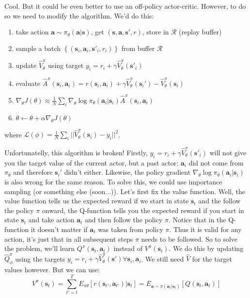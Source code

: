 \documentclass{report}
\begin{document}
Cool. But it could be even better to use an off-policy actor-critic.
However, to do so we need to modify the algorithm.
We'd do this:
\begin{enumerate}
		\item take action $\bm{a} \sim \pi_\theta(\bm{a}|\bm{s})$, get $(\bm{s}, \bm{a},\bm{s'},r)$, store in $\mathcal{R}$ (replay buffer)
		\item sample a batch $\left\{  (\bm{s}_i, \bm{a}_i,\bm{s'}_i,r_i) \right\} $ from buffer $\mathcal{R}$
		\item update $\hat{V}^\pi_\theta$ using target $y_i = r_i + \gamma \hat{V}^\pi_\theta(\bm{s'}_i)$
		\item evaluate $\hat{A}^\pi(\bm{s}_{i}, \bm{a}_{i})  = r(\bm{s}_{i}, \bm{a}_{i}) + \gamma \hat{V}^\pi_\theta(\bm{s}_i') - \hat{V}^\pi_\theta(\bm{s}_i)$
		\item $\nabla_\theta J(\theta) \approx  \frac{1}{N} \sum_{i}^{}  \nabla_{\theta} \log \pi_\theta(\bm{a}_i|\bm{s}_i)\hat{A}^\pi(\bm{s}_{i}, \bm{a}_{i})$
		\item $\theta \leftarrow \theta  + \alpha \nabla_\theta J(\theta)$
\end{enumerate}
where  $\mathcal{L}(\phi) = \frac{1}{N} \sum_{i}^{} || \hat{V}^\pi_\theta(\bm{s}_i) - y_i||^2 $.

Unfortunatelly, this algorithm is broken!
Firstly, $y_i = r_i + \gamma \hat{V}^\pi_\theta(\bm{s'}_i)$ will not give you the target value 
of the current actor, but a past actor: $\bm{a}_i$ did not come from $\pi_\theta$
and therefore $\bm{s}_i'$ didn't either.
Likewise, the policy gradient $\nabla_{\theta} \log \pi_\theta(\bm{a}_i|\bm{s}_i)$ is also wrong for the same reason.
To solve this, we could use importance sampling (or something else (soon...)).
Let's first fix the value function.
Well, the value function tells us the expected reward if we start in state $\bm{s}_t$ and the follow the policy $\pi$ onward,
the Q-function tells you the expected reward if you start in state $\bm{s}_t$ and take action $\bm{a}_t$ and then 
follow the policy $\pi$.
Notice that in the Q-function it doesn't matter if $\bm{a}_t$ was taken from policy $\pi$.
Thus it is valid for any action, it's just that in all subsequent steps $\pi$ needs to be followed.
So to solve the problem, we'll learn $Q^\pi(\bm{s}_{t}, \bm{a}_{t})$ instead of $V^\pi(\bm{s}_t)$.
We do this by updating $\hat{Q}^\pi_\phi $ using the targets
$y_i = r_i + \gamma \hat{V}^\pi_\theta(\bm{s}') \forall \bm{s}_i, \bm{a}_i$.
We still need $\hat{V}$ for the target values however.
But we can use:
\begin{equation}
		V^\pi(\bm{s}_t) = \sum_{t'=t}^{T} E_{\pi\theta} \left[ r(\bm{s}_{t'}, \bm{a}_{t'})|\bm{s}_t \right] = E_{\bm{a} \sim \pi(\bm{a}_t | \bm{s}_t)} \left[ Q(\bm{s}_{t}, \bm{a}_{t}) \right] 
\end{equation}
\end{document}
